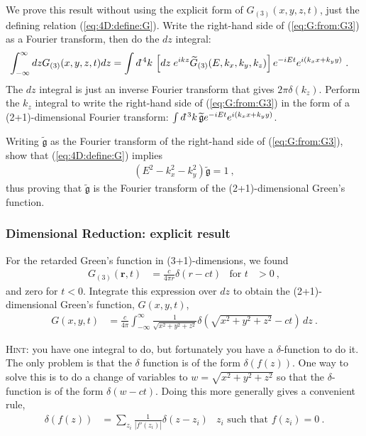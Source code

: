 \documentclass[12pt]{article}
\numberwithin{equation}{subsection}    %
\renewcommand{\tilde}{\widetilde}   %
\renewcommand{\vec}[1]{\mathbf{#1}} %
\newcommand{\dbar}{d\mkern-6mu\mathchar'26}    %
\begin{document}
We prove this result without using the explicit form of $G_{(3)}(x,y,z,t)$, just the defining relation (\ref{eq:4D:define:G}). Write the right-hand side of (\ref{eq:G:from:G3}) as a Fourier transform, then do the $dz$ integral:
\begin{align}
	\int_{-\infty}^\infty dz G_{(3)}(x,y,z,t)dz
	&=
	\int \dbar^4k \,
	\left[dz\; e^{ikz} \tilde G_{(3)}(E,k_x, k_y, k_z)\right]
	 e^{-iEt} e^{i(k_xx + k_y y)} \ .
\end{align}
The $dz$ integral is just an inverse Fourier transform that gives $2\pi\delta(k_z)$. Perform the $k_z$ integral to write the right-hand side of (\ref{eq:G:from:G3}) in the form of a (2+1)-dimensional Fourier transform: $\int \dbar^3 k \, \tilde{\mathfrak{g}}e^{-iEt}e^{i(k_xx+k_yy)}$. 

Writing $\tilde{\mathfrak{g}}$ as the Fourier transform of the right-hand side of (\ref{eq:G:from:G3}), show that (\ref{eq:4D:define:G}) implies
\begin{align}
	\left(E^2 - k_x^2 - k_y^2\right) \tilde{\mathfrak{g}} = 1\ ,
\end{align}
thus proving that $\tilde{\mathfrak{g}}$ is the Fourier transform of the (2+1)-dimensional Green's function.

\subsubsection{Dimensional Reduction: explicit result}

For the retarded Green's function in (3+1)-dimensions, we found
\begin{align}
	G_{(3)}(\vec r,t) &= \frac{c}{4\pi r} \delta(r-ct)
	&
	\text{for } t&>0 \ ,
\end{align}
and zero for $t<0$. Integrate this expression over $dz$ to obtain the (2+1)-dimensional Green's function, $G(x,y,t)$,
\begin{align}
	G(x,y,t) &= \frac{c}{4\pi} \int_{-\infty}^\infty 
	\frac{1}{\sqrt{x^2+y^2 + z^2}} \delta\left(\sqrt{x^2+y^2 + z^2} - ct\right) \, dz \ .
\end{align}

\textsc{Hint:} you have one integral to do, but fortunately you have a $\delta$-function to do it. The only problem is that the $\delta$ function is of the form $\delta\left(f(z)\right)$. One way to solve this is to do a change of variables to $w = \sqrt{x^2+y^2+z^2}$ so that the $\delta$-function is of the form $\delta(w-ct)$. Doing this more generally gives a convenient rule,
\begin{align}
	\delta\left(f(z)\right) &= \sum_{z_i} \frac{1}{|f'(z_i)|} \delta(z-z_i)
	&
	z_i \text{ such that } f(z_i) = 0 \ .
\end{align}
\end{document}
